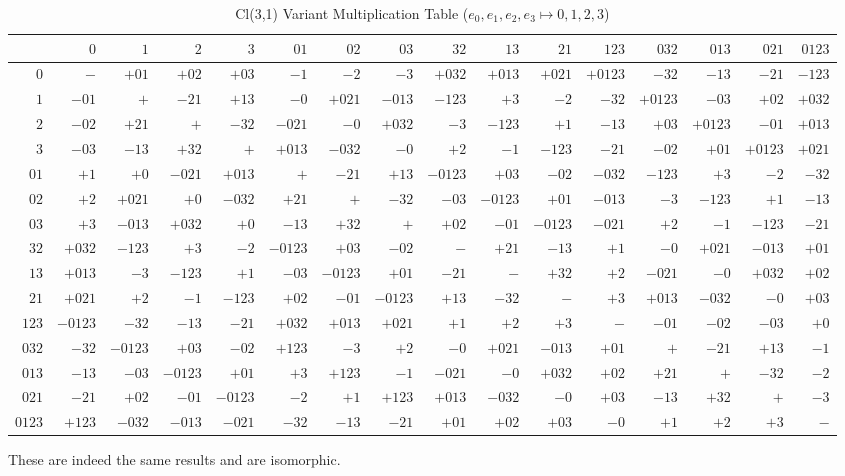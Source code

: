 \documentclass[dvipdfmx,a4paper]{article}
\begin{document}
\begin{table}[ht]
  \begin{center}
    \caption{Cl(3,1) Variant Multiplication Table ($e_0, e_1, e_2, e_3 \mapsto 0,1,2,3$)}
    \scriptsize
    \begin{tabular}{r|rrrrrrrrrrrrrrr}
      &$0$&$1$&$2$&$3$&$01$&$02$&$03$&$32$&$13$&$21$&$123$&$032$&$013$&$021$&$0123$\\\hline
      $0$&$-$&$+01$&$+02$&$+03$&$-1$&$-2$&$-3$&$+032$&$+013$&$+021$&$+0123$&$-32$&$-13$&$-21$&$-123$\\
      $1$&$-01$&$+$&$-21$&$+13$&$-0$&$+021$&$-013$&$-123$&$+3$&$-2$&$-32$&$+0123$&$-03$&$+02$&$+032$\\
      $2$&$-02$&$+21$&$+$&$-32$&$-021$&$-0$&$+032$&$-3$&$-123$&$+1$&$-13$&$+03$&$+0123$&$-01$&$+013$\\
      $3$&$-03$&$-13$&$+32$&$+$&$+013$&$-032$&$-0$&$+2$&$-1$&$-123$&$-21$&$-02$&$+01$&$+0123$&$+021$\\
      $01$&$+1$&$+0$&$-021$&$+013$&$+$&$-21$&$+13$&$-0123$&$+03$&$-02$&$-032$&$-123$&$+3$&$-2$&$-32$\\
      $02$&$+2$&$+021$&$+0$&$-032$&$+21$&$+$&$-32$&$-03$&$-0123$&$+01$&$-013$&$-3$&$-123$&$+1$&$-13$\\
      $03$&$+3$&$-013$&$+032$&$+0$&$-13$&$+32$&$+$&$+02$&$-01$&$-0123$&$-021$&$+2$&$-1$&$-123$&$-21$\\
      $32$&$+032$&$-123$&$+3$&$-2$&$-0123$&$+03$&$-02$&$-$&$+21$&$-13$&$+1$&$-0$&$+021$&$-013$&$+01$\\
      $13$&$+013$&$-3$&$-123$&$+1$&$-03$&$-0123$&$+01$&$-21$&$-$&$+32$&$+2$&$-021$&$-0$&$+032$&$+02$\\
      $21$&$+021$&$+2$&$-1$&$-123$&$+02$&$-01$&$-0123$&$+13$&$-32$&$-$&$+3$&$+013$&$-032$&$-0$&$+03$\\
      $123$&$-0123$&$-32$&$-13$&$-21$&$+032$&$+013$&$+021$&$+1$&$+2$&$+3$&$-$&$-01$&$-02$&$-03$&$+0$\\
      $032$&$-32$&$-0123$&$+03$&$-02$&$+123$&$-3$&$+2$&$-0$&$+021$&$-013$&$+01$&$+$&$-21$&$+13$&$-1$\\
      $013$&$-13$&$-03$&$-0123$&$+01$&$+3$&$+123$&$-1$&$-021$&$-0$&$+032$&$+02$&$+21$&$+$&$-32$&$-2$\\
      $021$&$-21$&$+02$&$-01$&$-0123$&$-2$&$+1$&$+123$&$+013$&$-032$&$-0$&$+03$&$-13$&$+32$&$+$&$-3$\\
      $0123$&$+123$&$-032$&$-013$&$-021$&$-32$&$-13$&$-21$&$+01$&$+02$&$+03$&$-0$&$+1$&$+2$&$+3$&$-$\\
    \end{tabular}
  \end{center}
\end{table}
These are indeed the same results and are isomorphic.
\clearpage
\end{document}
